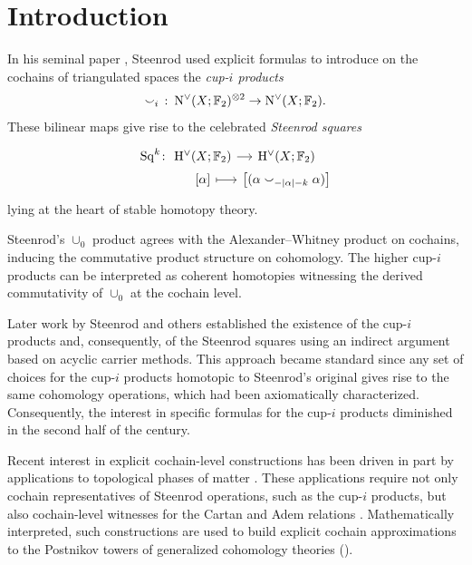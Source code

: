 
\section{Introduction}\label{s:introduction}

In his seminal paper \cite{steenrod1947products}, Steenrod used explicit formulas to introduce on the cochains of triangulated spaces the \textit{cup-$i$ products}
\[
\smallsmile_i\ \colon \operatorname{N^{\vee}}(X; {\mathbb{F}_2})^{\otimes 2} \to \operatorname{N^{\vee}}(X; {\mathbb{F}_2}).
\]
These bilinear maps give rise to the celebrated \textit{Steenrod squares}
\[
\begin{tikzcd}[column sep=0, row sep=0]
	\Sq^k \colon &[-5pt] \rH^\vee(X; \F) \rar & \rH^\vee(X; \F) \\
	& {[\alpha]} \rar[maps to] & \big[(\alpha \cup_{-\bars{\alpha}-k} \alpha)\big]
\end{tikzcd}
\]
lying at the heart of stable homotopy theory.

Steenrod's $\cup_0$ product agrees with the Alexander--Whitney product on cochains, inducing the commutative product structure on cohomology.
The higher cup-$i$ products can be interpreted as coherent homotopies witnessing the derived commutativity of $\cup_0$ at the cochain level.

Later work by Steenrod and others established the existence of the cup-$i$ products and, consequently, of the Steenrod squares using an indirect argument based on acyclic carrier methods.
This approach became standard since any set of choices for the cup-$i$ products homotopic to Steenrod's original gives rise to the same cohomology operations, which had been axiomatically characterized.
Consequently, the interest in specific formulas for the cup-$i$ products diminished in the second half of the century.

Recent interest in explicit cochain-level constructions has been driven in part by applications to topological phases of matter \cite{chen2012symmetry, chen2013symmetry, gu2014symmetry, kapustin2015fermionic_cobordisms, gaiotto2016spin, kapustin2017fermionic, meng2018classification, wang2020construction, barkeshli2022classification, feng2026anyonic}.
These applications require not only cochain representatives of Steenrod operations, such as the cup-$i$ products, but also cochain-level witnesses for the Cartan and Adem relations \cite{medina2020cartan, medina2021adem, medina2025odd_cartan}.
Mathematically interpreted, such constructions are used to build explicit cochain approximations to the Postnikov towers of generalized cohomology theories (\cite{brumfiel2016pontrjagin, brumfiel2018pontrjagin}).


